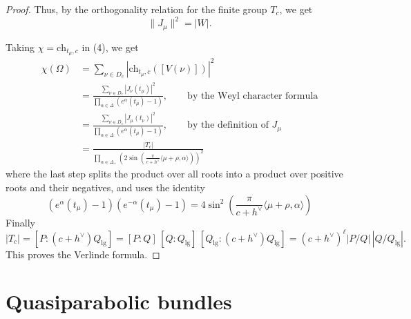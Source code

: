 \documentclass[12pt]{article}
\begin{document}
\begin{proof}
Thus, by the orthogonality relation for the finite group \(T_c\), we get
\begin{equation}
\|J_\mu\|^2=|W|.
\end{equation}

Taking \(\chi=\mathrm{ch}_{t_\mu,c}\) in (4), we get
\begin{align}
\chi(\Omega)
&=
\sum_{\nu\in D_c}\left|\mathrm{ch}_{t_\mu,c}([V(\nu)])\right|^2 \nonumber\\
&=
\frac{\sum_{\nu\in D_c}|J_\nu(t_\mu)|^2}
{\prod_{\alpha\in \Delta}(e^\alpha(t_\mu)-1)},
\qquad \text{by the Weyl character formula} \nonumber\\
&=
\frac{\sum_{\nu\in D_c}|J_\mu(t_\nu)|^2}
{\prod_{\alpha\in \Delta}(e^\alpha(t_\mu)-1)},
\qquad \text{by the definition of } J_\mu \nonumber\\
&=
\frac{|T_c|}
{\prod_{\alpha\in \Delta_+}
\left(
2\sin\left(\frac{\pi}{c+h^\vee}\langle \mu+\rho,\alpha\rangle\right)
\right)^2}
\end{align} where the last step splits the product over all roots into a product over positive roots and their negatives, and uses the identity \[(e^\alpha(t_\mu)-1)(e^{-\alpha}(t_\mu)-1)
=
4\sin^2\left(\frac{\pi}{c+h^\vee}\langle \mu+\rho,\alpha\rangle\right)\]
Finally
\[
|T_c|=[P:(c+h^\vee)Q_{\mathrm{lg}}] = 
[P:Q]\,[Q:Q_{\mathrm{lg}}]\,[Q_{\mathrm{lg}}:(c+h^\vee)Q_{\mathrm{lg}}] = (c+h^\vee)^\ell |P/Q|\,|Q/Q_{\mathrm{lg}}|.
\]
This proves the Verlinde formula.
\end{proof}

\section{Quasiparabolic bundles}
\end{document}
